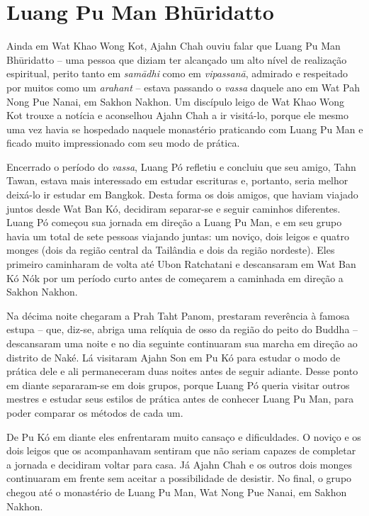 \thistitleoffsettrue
\chapter{Luang Pu Man Bhūridatto}

Ainda em Wat Khao Wong Kot, Ajahn Chah ouviu falar que Luang Pu Man
Bhūridatto -- uma pessoa que diziam ter alcançado um alto nível de
realização espiritual, perito tanto em \emph{samādhi} como em
\emph{vipassanā}, admirado e respeitado por muitos como um
\emph{arahant} -- estava passando o \emph{vassa} daquele ano em Wat Pah
Nong Pue Nanai, em Sakhon Nakhon. Um discípulo leigo de Wat Khao Wong
Kot trouxe a notícia e aconselhou Ajahn Chah a ir visitá-lo, porque ele
mesmo uma vez havia se hospedado naquele monastério praticando com Luang
Pu Man e ficado muito impressionado com seu modo de prática.

Encerrado o período do \emph{vassa}, Luang Pó refletiu e concluiu que
seu amigo, Tahn Tawan, estava mais interessado em estudar escrituras e,
portanto, seria melhor deixá-lo ir estudar em Bangkok. Desta forma os
dois amigos, que haviam viajado juntos desde Wat Ban Kó, decidiram
separar-se e seguir caminhos diferentes. Luang Pó começou sua jornada em
direção a Luang Pu Man, e em seu grupo havia um total de sete pessoas
viajando juntas: um noviço, dois leigos e quatro monges (dois da região
central da Tailândia e dois da região nordeste). Eles primeiro
caminharam de volta até Ubon Ratchatani e descansaram em Wat Ban Kó Nók
por um período curto antes de começarem a caminhada em direção a Sakhon
Nakhon.

Na décima noite chegaram a Prah Taht Panom, prestaram reverência à
famosa estupa -- que, diz-se, abriga uma relíquia de osso da região do
peito do Buddha -- descansaram uma noite e no dia seguinte continuaram
sua marcha em direção ao distrito de Naké. Lá visitaram Ajahn Son em Pu
Kó para estudar o modo de prática dele e ali permaneceram duas noites
antes de seguir adiante. Desse ponto em diante separaram-se em dois
grupos, porque Luang Pó queria visitar outros mestres e estudar seus
estilos de prática antes de conhecer Luang Pu Man, para poder comparar
os métodos de cada um.

De Pu Kó em diante eles enfrentaram muito cansaço e dificuldades. O
noviço e os dois leigos que os acompanhavam sentiram que não seriam
capazes de completar a jornada e decidiram voltar para casa. Já Ajahn
Chah e os outros dois monges continuaram em frente sem aceitar a
possibilidade de desistir. No final, o grupo chegou até o monastério de
Luang Pu Man, Wat Nong Pue Nanai, em Sakhon Nakhon.

